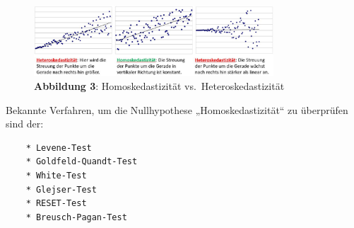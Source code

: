 \documentclass[]{article}
\begin{document}
\begin{figure}
\centering
\includegraphics[width=0.80000\textwidth]{Images/Homoskedastizitaet.JPG}
\caption{\textbf{Abbildung 3}: Homoskedastizität
vs.~Heteroskedastizität}
\end{figure}

Bekannte Verfahren, um die Nullhypothese „Homoskedastizität`` zu
überprüfen sind der:

\begin{verbatim}
    * Levene-Test
    * Goldfeld-Quandt-Test
    * White-Test
    * Glejser-Test
    * RESET-Test
    * Breusch-Pagan-Test
\end{verbatim}
\end{document}
